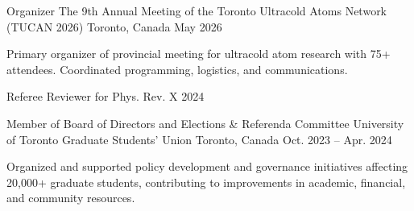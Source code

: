 

\begin{cventries}

   \cventry
      {Organizer} %
      {The 9th Annual Meeting of the Toronto Ultracold Atoms Network (TUCAN 2026)} %
      {Toronto, Canada} %
      {May 2026} %
      {
        \begin{cvitems}
        \item {Primary organizer of provincial meeting for ultracold atom research with 75+ attendees. Coordinated programming, logistics, and communications.}
        \end{cvitems}
      }

    \cventry
      {Referee} %
      {Reviewer for Phys. Rev. X} %
      {} %
      {2024} %
      {}

  \cventry
    {Member of Board of Directors and Elections \& Referenda Committee} %
    {University of Toronto Graduate Students' Union} %
    {Toronto, Canada} %
    {Oct. 2023 -- Apr. 2024} %
    {
      \begin{cvitems} %
        \item {Organized and supported policy development and governance initiatives affecting 20,000+ graduate students, contributing to improvements in academic, financial, and community resources.}
      \end{cvitems}
    }


\end{cventries}

